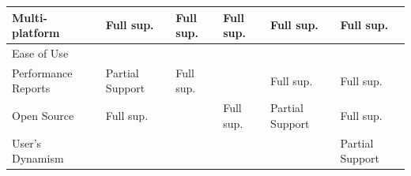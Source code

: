 \documentclass[espaco=umemeio,chapter=TITLE,twoside,openright]{abnt}
\begin{document}
\begin{table}[]
\begin{tabular}{|l|l|l|l|l|l|}
\cellcolor[HTML]{EFEFEF}Multi-platform                & Full sup.      & Full sup.     & Full sup.   & Full sup.           & Full sup.   \\ \hline
\cellcolor[HTML]{EFEFEF}Ease of Use                   &                   &                  &                &                        &                \\ \hline
\cellcolor[HTML]{EFEFEF}\begin{minipage}{0.2\textwidth}Performance Reports\end{minipage}           & Partial Support    & Full sup.     &                & Full sup.           & Full sup.   \\ \hline
\cellcolor[HTML]{EFEFEF}Open Source                   & Full sup.      &                  & Full sup.   & Partial Support         & Full sup.   \\ \hline
\cellcolor[HTML]{EFEFEF}User’s Dynamism               &                   &                  &                &                        & Partial Support \\ \hline
\end{tabular}
\end{table}
\end{document}
